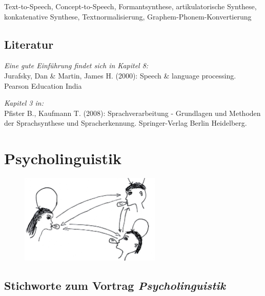 \documentclass[11pt]{book}
\begin{document}
Text-to-Speech, Concept-to-Speech, Formantsynthese, artikulatorische Synthese, konkatenative Synthese, Textnormalisierung, Graphem-Phonem-Konvertierung



\section{Literatur}


\emph{Eine gute Einführung findet sich in Kapitel 8:}\\
Jurafsky, Dan \& Martin, James H. (2000): Speech \& language processing. Pearson Education India

\emph{Kapitel 3 in:}\\
Pfister B., Kaufmann T. (2008): Sprachverarbeitung - Grundlagen und 
	Methoden der Sprachsynthese und Spracherkennung. 
	Springer-Verlag Berlin Heidelberg.


\renewcommand\refname{\vskip -1cm}
{}










\chapter{Psycholinguistik}
\begin{figure}[htbp]
\begin{center}
\includegraphics[width=0.6\textwidth]{grafiken/psycholinguistik/psycholinguistik}
\label{t9}
\end{center}
\end{figure}

\section{Stichworte zum Vortrag \em{Psycholinguistik}}
\end{document}
